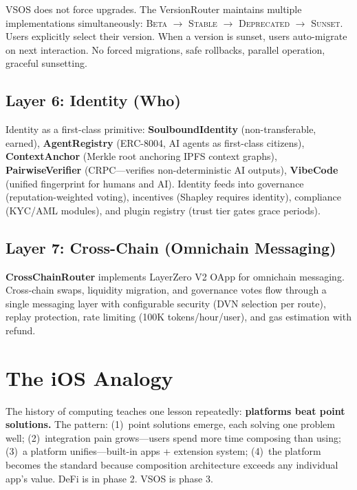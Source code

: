 \documentclass[9pt, letterpaper]{article}
\begin{document}
VSOS does not force upgrades. The VersionRouter maintains multiple implementations simultaneously: \textsc{Beta} $\to$ \textsc{Stable} $\to$ \textsc{Deprecated} $\to$ \textsc{Sunset}. Users explicitly select their version. When a version is sunset, users auto-migrate on next interaction. No forced migrations, safe rollbacks, parallel operation, graceful sunsetting.

\subsection{Layer 6: Identity (Who)}

Identity as a first-class primitive: \textbf{SoulboundIdentity} (non-transferable, earned), \textbf{AgentRegistry} (ERC-8004, AI agents as first-class citizens), \textbf{ContextAnchor} (Merkle root anchoring IPFS context graphs), \textbf{PairwiseVerifier} (CRPC---verifies non-deterministic AI outputs), \textbf{VibeCode} (unified fingerprint for humans and AI). Identity feeds into governance (reputation-weighted voting), incentives (Shapley requires identity), compliance (KYC/AML modules), and plugin registry (trust tier gates grace periods).

\subsection{Layer 7: Cross-Chain (Omnichain Messaging)}

\textbf{CrossChainRouter} implements LayerZero V2 OApp for omnichain messaging. Cross-chain swaps, liquidity migration, and governance votes flow through a single messaging layer with configurable security (DVN selection per route), replay protection, rate limiting (100K tokens/hour/user), and gas estimation with refund.


\section{The iOS Analogy}

The history of computing teaches one lesson repeatedly: \textbf{platforms beat point solutions.} The pattern: (1)~point solutions emerge, each solving one problem well; (2)~integration pain grows---users spend more time composing than using; (3)~a platform unifies---built-in apps + extension system; (4)~the platform becomes the standard because composition architecture exceeds any individual app's value. DeFi is in phase 2. VSOS is phase 3.
\end{document}
